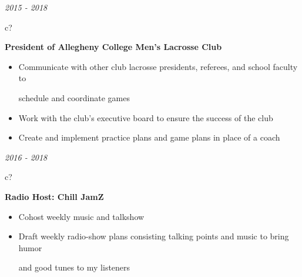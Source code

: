 \documentclass[12pt,a4paper,sans]{moderncv} %
\begin{document}
 
\textit{2015 - 2018}
\hspace{2 mm}
\begin{tabular}{c?}
 \\
\end{tabular}
 \hspace{2 mm}
 \textbf{President of Allegheny College Men's Lacrosse Club} 
 \vspace{0 mm}
 \begin{itemize}
 \addtolength{\itemindent}{31.7 mm}
 \item{Communicate with other club lacrosse presidents, referees, and school faculty to 
 
 \hspace{32 mm}schedule and coordinate games}
 
 
 \item{Work with the club's executive board to ensure the success of the club }
 \item{Create and implement practice plans and game plans in place of a coach}
 \end{itemize}
 
  
\textit{2016 - 2018}
\hspace{2.0 mm}
\begin{tabular}{c?}
 \\
\end{tabular}
 \hspace{2 mm}
 \textbf{Radio Host: Chill JamZ} 
 \vspace{0 mm}
 \begin{itemize}
 \addtolength{\itemindent}{31.7 mm}
 \item{Cohost weekly music and talkshow}
 \item{Draft weekly radio-show plans consisting talking points and music to bring humor 
 
 \hspace{32 mm}and good tunes to my listeners}
 \end{itemize}
 


\end{document}
